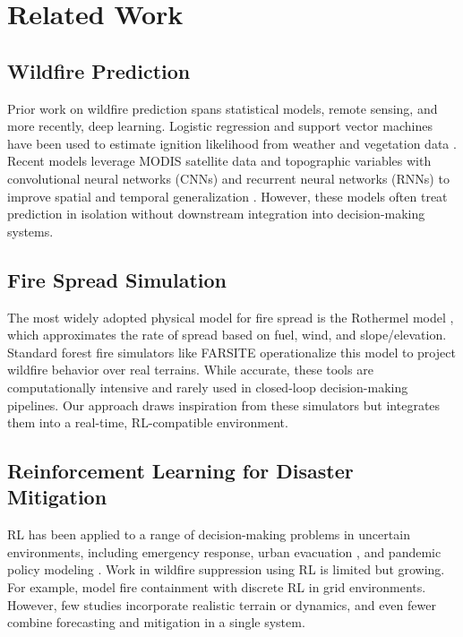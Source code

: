 \documentclass[conference]{IEEEtran}
\begin{document}
\section{Related Work}

\subsection{Wildfire Prediction}
Prior work on wildfire prediction spans statistical models, remote sensing, and more recently, deep learning. Logistic regression and support vector machines have been used to estimate ignition likelihood from weather and vegetation data \cite{price2004sensitivity, chuvieco2010integrated}. Recent models leverage MODIS satellite data and topographic variables with convolutional neural networks (CNNs) and recurrent neural networks (RNNs) to improve spatial and temporal generalization \cite{gollner2020deep, zhang2022wildfire}. However, these models often treat prediction in isolation without downstream integration into decision-making systems.

\subsection{Fire Spread Simulation}
The most widely adopted physical model for fire spread is the Rothermel model \cite{rothermel1972}, which approximates the rate of spread based on fuel, wind, and slope/elevation. Standard forest fire simulators like FARSITE \cite{finney2004farsite} operationalize this model to project wildfire behavior over real terrains. While accurate, these tools are computationally intensive and rarely used in closed-loop decision-making pipelines. Our approach draws inspiration from these simulators but integrates them into a real-time, RL-compatible environment.

\subsection{Reinforcement Learning for Disaster Mitigation}
RL has been applied to a range of decision-making problems in uncertain environments, including emergency response, urban evacuation \cite{li2021reinforcement}, and pandemic policy modeling \cite{matteo2021covid}. Work in wildfire suppression using RL is limited but growing. For example, \cite{julian2020wildfire} model fire containment with discrete RL in grid environments. However, few studies incorporate realistic terrain or dynamics, and even fewer combine forecasting and mitigation in a single system.
\end{document}
